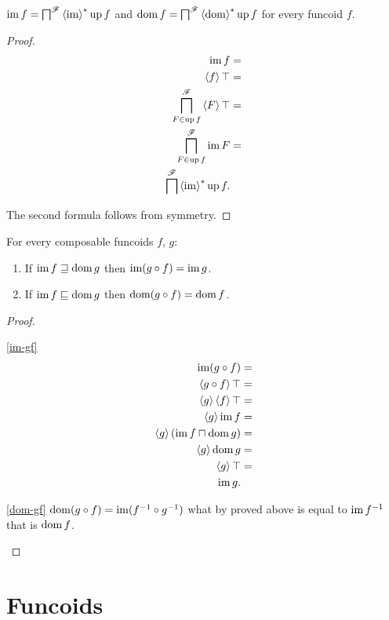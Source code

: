 \begin{thm}
$\im f=\bigsqcap^{\mathscr{F}}\rsupfun{\im}\up f$ and $\dom
f=\bigsqcap^{\mathscr{F}}\rsupfun{\dom}\up f$
for every funcoid $f$.\end{thm}
\begin{proof}
~
\begin{align*}
\im f & =\\
\supfun f\top & =\\
\bigsqcap_{F\in\up f}^{\mathscr{F}}\supfun F\top & =\\
\bigsqcap_{F\in\up f}^{\mathscr{F}}\im F & =\\
\bigsqcap^{\mathscr{F}}\rsupfun{\im}\up f.
\end{align*}


The second formula follows from symmetry.\end{proof}
\begin{prop}
For every composable funcoids $f$, $g$:
\begin{enumerate}
\item \label{im-gf}If $\im f\sqsupseteq\dom g$ then $\im(g\circ f)=\im g$.
\item \label{dom-gf}If $\im f\sqsubseteq\dom g$ then $\dom(g\circ f)=\dom f$.
\end{enumerate}
\end{prop}
\begin{proof}
~
\begin{widedisorder}
\item [{\ref{im-gf}}] ~
\begin{align*}
\im(g\circ f) & =\\
\supfun{g\circ f}\top & =\\
\supfun g\supfun f\top & =\\
\supfun g\im f & =\\
\supfun g(\im f\sqcap\dom g) & =\\
\supfun g\dom g & =\\
\supfun g\top & =\\
\im g.
\end{align*}

\item [{\ref{dom-gf}}] $\dom(g\circ f)=\im(f^{-1}\circ g^{-1})$ what
by proved above is equal to $\im f^{-1}$ that is $\dom f$.
\end{widedisorder}
\end{proof}
\chapter{Funcoids}

